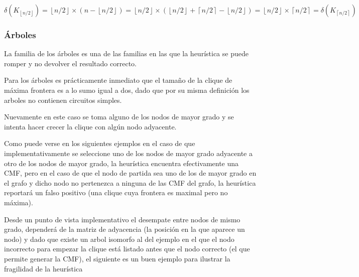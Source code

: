 	\( 
	\delta(K_{\left \lfloor{n/2}\right \rfloor}) = 
	\left \lfloor{n/2} \right \rfloor \times 
	(n - \left \lfloor{n/2} \right \rfloor ) = 
	\left \lfloor{n/2} \right \rfloor \times 
	(\left \lfloor{n/2} \right \rfloor +
	\left \lceil{n/2} \right \rceil - 
	\left \lfloor{n/2} \right \rfloor) =
	\left \lfloor{n/2} \right \rfloor \times
	\left \lceil{n/2} \right \rceil = 
	\delta(K_{\left \lceil{n/2}\right \rceil})
	\)

\subsubsection{\'Arboles}
La familia de los \'arboles es una de las familias en las que la heur\'istica
se puede romper y no devolver el resultado correcto. 

Para los \'arboles es pr\'acticamente inmediato que el 
tama\~no de la clique de m\'axima frontera es a lo sumo igual a dos, dado
que por su misma definici\'on los arboles no contienen circuitos simples.

Nuevamente en este caso se toma alguno de los nodos de mayor grado 
y se intenta hacer crecer la clique con alg\'un nodo adyacente.

Como puede verse en los siguientes ejemplos en el caso de que 
implementativamente se seleccione uno de los nodos de mayor grado
adyacente a otro de los nodos de mayor grado, la heur\'istica encuentra
efectivamente una CMF, pero en el caso de que el nodo de partida sea 
uno de los de mayor grado en el grafo y dicho nodo no pertenezca a
ninguna de las CMF del grafo, la heur\'istica reportar\'a un falso 
positivo (una clique cuya frontera es maximal pero no m\'axima).

Desde un punto de vista implementativo el desempate entre nodos de 
mismo grado, depender\'a de la matriz de adyacencia (la posici\'on en
la que aparece un nodo) y dado que existe un arbol isomorfo al del 
ejemplo en el que el nodo incorrecto para empezar la clique est\'a
listado antes que el nodo correcto (el que permite generar la CMF),
el siguiente es un buen ejemplo para ilustrar la fragilidad de la
heur\'istica

